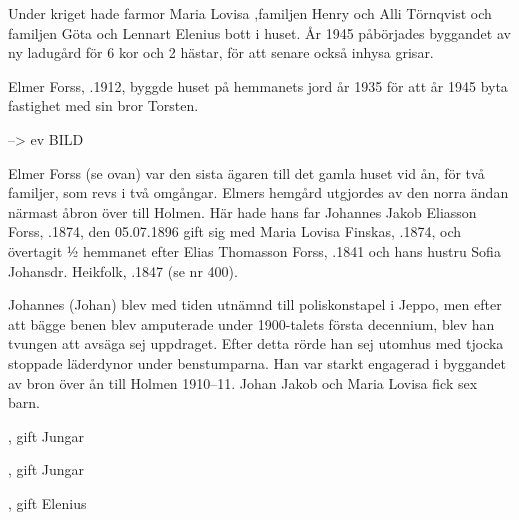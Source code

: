 Under kriget hade farmor Maria Lovisa ,familjen Henry och Alli Törnqvist och familjen Göta och Lennart Elenius bott i huset. År 1945 påbörjades byggandet av ny ladugård för 6 kor och 2 hästar, för att senare också inhysa grisar.
\begin{jhchildren}
  \item {}
  \item {}
  \item {}
  \item {}
\end{jhchildren}


Elmer Forss, .1912, byggde huset på hemmanets jord år 1935 för att år 1945 byta fastighet med sin bror Torsten.


     --> ev BILD


Elmer Forss (se ovan) var den sista ägaren till det gamla huset vid ån, för två familjer, som revs i två omgångar. Elmers hemgård utgjordes av den norra ändan närmast åbron över till Holmen. Här hade hans far Johannes Jakob Eliasson Forss, .1874, den 05.07.1896 gift sig med Maria Lovisa Finskas, .1874, och övertagit ½ hemmanet efter Elias Thomasson Forss, .1841 och hans hustru Sofia Johansdr. Heikfolk, .1847 (se nr 400).

Johannes (Johan) blev med tiden utnämnd till poliskonstapel i Jeppo, men efter att bägge benen blev amputerade under 1900-talets första decennium, blev han tvungen att avsäga sej uppdraget. Efter detta rörde han sej utomhus med tjocka stoppade läderdynor under benstumparna. Han var starkt engagerad i byggandet av bron över ån till Holmen 1910--11.
Johan Jakob och Maria Lovisa fick sex barn.
\begin{jhchildren}
  \item {}, gift Jungar
  \item {}
  \item {}, gift Jungar
  \item {}
  \item {}
  \item {}, gift Elenius
\end{jhchildren}

